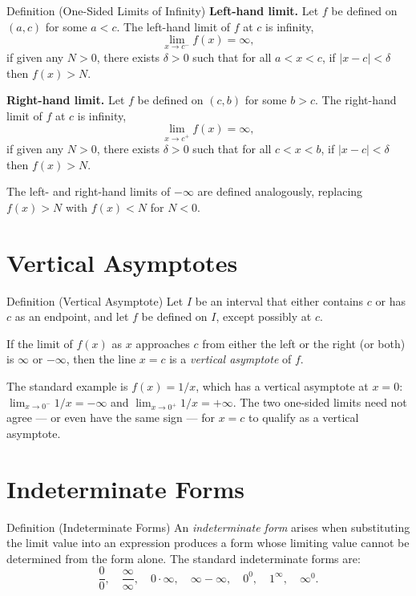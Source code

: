 \begin{propositionbox}{Definition (One-Sided Limits of Infinity)}
\textbf{Left-hand limit.}
Let $f$ be defined on $(a, c)$ for some $a < c$.
The left-hand limit of $f$ at $c$ is infinity,
\[
  \lim_{x \to c^-} f(x) = \infty,
\]
if given any $N > 0$, there exists $\delta > 0$ such that for all
$a < x < c$, if $|x - c| < \delta$ then $f(x) > N$.

\medskip
\textbf{Right-hand limit.}
Let $f$ be defined on $(c, b)$ for some $b > c$.
The right-hand limit of $f$ at $c$ is infinity,
\[
  \lim_{x \to c^+} f(x) = \infty,
\]
if given any $N > 0$, there exists $\delta > 0$ such that for all
$c < x < b$, if $|x - c| < \delta$ then $f(x) > N$.

\medskip
The left- and right-hand limits of $-\infty$ are defined analogously,
replacing $f(x) > N$ with $f(x) < N$ for $N < 0$.
\end{propositionbox}

\section*{Vertical Asymptotes}

\begin{propositionbox}{Definition (Vertical Asymptote)}
Let $I$ be an interval that either contains $c$ or has $c$ as an
endpoint, and let $f$ be defined on $I$, except possibly at $c$.

If the limit of $f(x)$ as $x$ approaches $c$ from either the left
or the right (or both) is $\infty$ or $-\infty$, then the line
$x = c$ is a \emph{vertical asymptote} of $f$.
\end{propositionbox}

\begin{remark*}
The standard example is $f(x) = 1/x$, which has a vertical asymptote
at $x = 0$: $\lim_{x \to 0^-} 1/x = -\infty$ and
$\lim_{x \to 0^+} 1/x = +\infty$.
The two one-sided limits need not agree --- or even have the same
sign --- for $x = c$ to qualify as a vertical asymptote.
\end{remark*}

\section*{Indeterminate Forms}

\begin{propositionbox}{Definition (Indeterminate Forms)}
An \emph{indeterminate form} arises when substituting the limit
value into an expression produces a form whose limiting value
cannot be determined from the form alone.
The standard indeterminate forms are:
\[
  \frac{0}{0}, \quad
  \frac{\infty}{\infty}, \quad
  0 \cdot \infty, \quad
  \infty - \infty, \quad
  0^0, \quad
  1^\infty, \quad
  \infty^0.
\]
\end{propositionbox}

